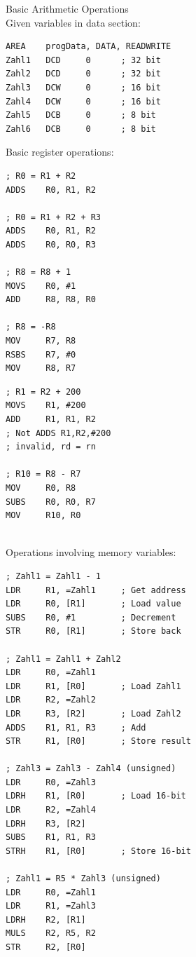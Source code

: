 \begin{example2}{Basic Arithmetic Operations}\\
Given variables in data section:
\begin{lstlisting}[language=armasm, style=basesmol]
    AREA    progData, DATA, READWRITE
Zahl1   DCD     0      ; 32 bit
Zahl2   DCD     0      ; 32 bit 
Zahl3   DCW     0      ; 16 bit
Zahl4   DCW     0      ; 16 bit
Zahl5   DCB     0      ; 8 bit
Zahl6   DCB     0      ; 8 bit
\end{lstlisting}

Basic register operations:

\begin{minipage}{0.4\linewidth}
\begin{lstlisting}[language=armasm, style=basesmol]
; R0 = R1 + R2
ADDS    R0, R1, R2

; R0 = R1 + R2 + R3
ADDS    R0, R1, R2
ADDS    R0, R0, R3

; R8 = R8 + 1
MOVS    R0, #1
ADD     R8, R8, R0

; R8 = -R8
MOV     R7, R8
RSBS    R7, #0
MOV     R8, R7
\end{lstlisting}
\end{minipage}
\hspace{4mm}
\begin{minipage}{0.5\linewidth}
\begin{lstlisting}[language=armasm, style=basesmol]
; R1 = R2 + 200
MOVS    R1, #200
ADD     R1, R1, R2 
; Not ADDS R1,R2,#200 
; invalid, rd = rn    

; R10 = R8 - R7
MOV     R0, R8
SUBS    R0, R0, R7
MOV     R10, R0
\end{lstlisting}
\end{minipage}
\vspace{2mm}\\
Operations involving memory variables:
\begin{lstlisting}[language=armasm, style=basesmol]
; Zahl1 = Zahl1 - 1
LDR     R1, =Zahl1     ; Get address
LDR     R0, [R1]       ; Load value
SUBS    R0, #1         ; Decrement
STR     R0, [R1]       ; Store back

; Zahl1 = Zahl1 + Zahl2
LDR     R0, =Zahl1
LDR     R1, [R0]       ; Load Zahl1
LDR     R2, =Zahl2
LDR     R3, [R2]       ; Load Zahl2
ADDS    R1, R1, R3     ; Add
STR     R1, [R0]       ; Store result

; Zahl3 = Zahl3 - Zahl4 (unsigned)
LDR     R0, =Zahl3
LDRH    R1, [R0]       ; Load 16-bit
LDR     R2, =Zahl4
LDRH    R3, [R2]
SUBS    R1, R1, R3
STRH    R1, [R0]       ; Store 16-bit

; Zahl1 = R5 * Zahl3 (unsigned)
LDR     R0, =Zahl1
LDR     R1, =Zahl3
LDRH    R2, [R1]
MULS    R2, R5, R2
STR     R2, [R0]
\end{lstlisting}
\end{example2}


